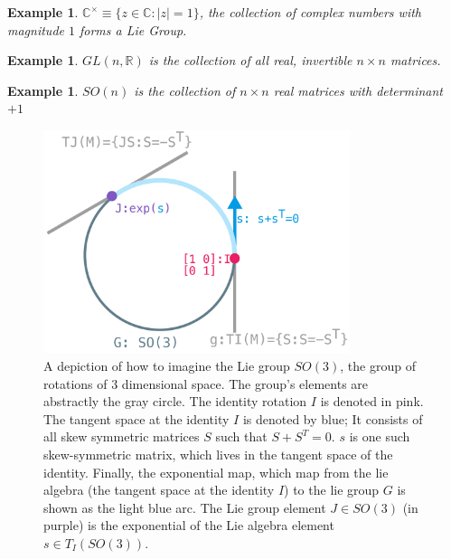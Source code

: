 \documentclass[11pt]{book}
\newcommand{\R}{\ensuremath{\mathbb R}}
\newtheorem{example}[theorem]{Example}
\begin{document}
\begin{example}
$\mathbb C^\times \equiv \{ z \in \mathbb C : |z| = 1 \}$, the collection of complex numbers with magnitude $1$
forms a Lie Group.
\end{example}

\begin{example}
$GL(n, \R)$ is the collection of all \emph{real}, invertible $n \times n$ matrices.
\end{example}

\begin{example}
$SO(n)$ is the collection of $n\times n$ real matrices with determinant $+1$
\end{example}

\begin{figure}[htb]
\includegraphics[width=0.8\textwidth]{./lie-group.pdf}
\caption{A depiction of how to imagine the Lie group $SO(3)$, the group of rotations of 3 dimensional space. The group's
elements are abstractly the gray circle. The identity rotation $I$ is denoted in pink. The tangent space at the identity $I$ is
denoted by blue; It consists of all skew symmetric matrices $S$ such that $S + S^T = 0$.  $s$ is one such skew-symmetric matrix,
which lives in the tangent space of the identity. Finally, the exponential map, which map from the lie algebra (the tangent space at the identity $I$)
to the lie group $G$ is shown as the light blue arc. The Lie group element $J \in SO(3) $ (in purple) is the exponential of the 
Lie algebra element $s \in T_I(SO(3))$.}
\end{figure}
\end{document}

